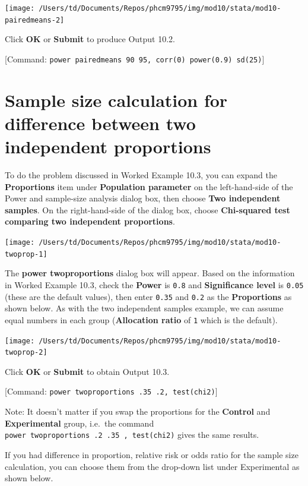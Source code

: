 \documentclass[
]{memoir}
\begin{document}
\texttt{[image: /Users/td/Documents/Repos/phcm9795/img/mod10/stata/mod10-pairedmeans-2]}

Click \textbf{OK} or \textbf{Submit} to produce Output 10.2.

{[}Command: \texttt{power\ pairedmeans\ 90\ 95,\ corr(0)\ power(0.9)\ sd(25)}{]}

\hypertarget{sample-size-calculation-for-difference-between-two-independent-proportions}{%
\section{Sample size calculation for difference between two independent proportions}\label{sample-size-calculation-for-difference-between-two-independent-proportions}}

To do the problem discussed in Worked Example 10.3, you can expand the \textbf{Proportions} item under \textbf{Population parameter} on the left-hand-side of the Power and sample-size analysis dialog box, then choose \textbf{Two independent samples}. On the right-hand-side of the dialog box, choose \textbf{Chi-squared test comparing two independent proportions}.

\texttt{[image: /Users/td/Documents/Repos/phcm9795/img/mod10/stata/mod10-twoprop-1]}

The \textbf{power twoproportions} dialog box will appear. Based on the information in Worked Example 10.3, check the \textbf{Power} is \texttt{0.8} and \textbf{Significance level} is \texttt{0.05} (these are the default values), then enter \texttt{0.35} and \texttt{0.2} as the \textbf{Proportions} as shown below. As with the two independent samples example, we can assume equal numbers in each group (\textbf{Allocation ratio} of \texttt{1} which is the default).

\texttt{[image: /Users/td/Documents/Repos/phcm9795/img/mod10/stata/mod10-twoprop-2]}

Click \textbf{OK} or \textbf{Submit} to obtain Output 10.3.

{[}Command: \texttt{power\ twoproportions\ .35\ .2,\ test(chi2)}{]}

Note: It doesn't matter if you swap the proportions for the \textbf{Control} and \textbf{Experimental} group, i.e.~the command \texttt{power\ twoproportions\ .2\ .35\ ,\ test(chi2)} gives the same results.

If you had difference in proportion, relative risk or odds ratio for the sample size calculation, you can choose them from the drop-down list under Experimental as shown below.
\end{document}
